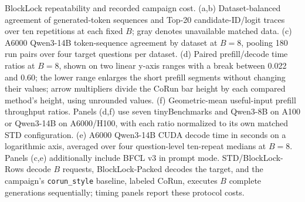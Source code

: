 \caption{BlockLock repeatability and recorded campaign cost. (a,b) Dataset-balanced agreement of generated-token sequences and Top-20 candidate-ID/logit traces over ten repetitions at each fixed $B$; gray denotes unavailable matched data. (c) A6000 Qwen3-14B token-sequence agreement by dataset at $B=8$, pooling 180 run pairs over four target questions per dataset. (d) Paired prefill/decode time ratios at $B=8$, shown on two linear y-axis ranges with a break between 0.022 and 0.60; the lower range enlarges the short prefill segments without changing their values; arrow multipliers divide the CoRun bar height by each compared method's height, using unrounded values. (f) Geometric-mean useful-input prefill throughput ratios. Panels (d,f) use seven tinyBenchmarks and Qwen3-8B on A100 or Qwen3-14B on A6000/H100, with each ratio normalized to its own matched STD configuration. (e) A6000 Qwen3-14B CUDA decode time in seconds on a logarithmic axis, averaged over four question-level ten-repeat medians at $B=8$. Panels (c,e) additionally include BFCL v3 in prompt mode. STD/BlockLock-Rows decode $B$ requests, BlockLock-Packed decodes the target, and the campaign's \texttt{corun\_style} baseline, labeled CoRun, executes $B$ complete generations sequentially; timing panels report these protocol costs.}
\label{fig:blocklock-overview-six-panels}
